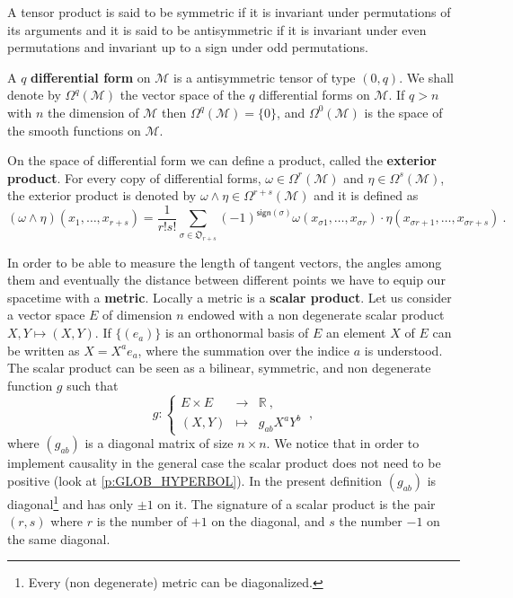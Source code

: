 \documentclass[11pt]{book}
\newcommand{\Mcal}{\mathcal{M}}
\newcommand{\Rbb}{\mathbb{R}}
\newcommand{\Orak}{\mathfrak{O}}
\theoremstyle{break}
\begin{document}
A tensor product is said to be symmetric if it is invariant under permutations of its arguments and it is said to be antisymmetric if it is invariant under even permutations and invariant up to a sign under odd permutations.


A $q$ \textbf{differential form} on $\Mcal$ is a antisymmetric tensor of type $(0,q)$. We shall denote by $\Omega^q(\Mcal)$ the vector space of the $q$ differential forms on $\Mcal$. If $q > n$ with $n$ the dimension of $\Mcal$ then $\Omega^q(\Mcal)=\{0\}$, and $\Omega^0(\Mcal)$ is the space of the smooth functions on $\Mcal$.


On the space of differential form we can define a product, called the \textbf{exterior product}. For every copy of differential forms, $\omega \in \Omega^r(\Mcal)$ and $\eta \in \Omega^s(\Mcal)$, the exterior product is denoted by 
$\omega \wedge \eta \in \Omega^{r+s}(\Mcal)$ and it is defined  as
%
\begin{equation*}
(\omega \wedge \eta)(x_1,\dots,x_{r+s}) = \frac{1}{r!s!} \sum_{\sigma \in \Orak_{r+s}} (-1)^{\mathsf{sign}(\sigma)} \omega(x_{\sigma{1}},\dots,x_{\sigma{r}}) \cdot \eta(x_{\sigma{r+1}},\dots,x_{\sigma{r+s}}) \ .
\end{equation*}


\bigskip


In order to be able to measure the length of tangent vectors, the angles among them and eventually the distance between different points we have to equip our spacetime with a \textbf{metric}. Locally a metric is a \textbf{scalar product}. Let us consider a vector space $E$ of dimension $n$ endowed with a non degenerate scalar product $X,Y \mapsto (X,Y)$. If $\{(e_a)\}$ is an orthonormal basis of $E$ an element $X$ of $E$ can be written as $X = X^a e_a$, where the summation over the indice $a$ is understood. The scalar product can be seen as a bilinear, symmetric, and non degenerate function $g$ such that
%
\begin{equation*}
g : \left\{ 
\begin{array}{lcl}
E \times E & \to & \Rbb \ , \\
(X,Y) & \mapsto & g_{ab} X^a Y^b
\end{array}
\right. \ ,
\end{equation*}
%
where $(g_{ab})$ is a diagonal matrix of size $n \times n$. We notice that in order to implement causality in the general case the scalar product does not need to be positive (look at \ref{p:GLOB_HYPERBOL}). In the present definition $(g_{ab})$ is diagonal\footnote{Every (non degenerate) metric can be diagonalized.} and has only $\pm 1$ on it. The signature of a scalar product is the pair $(r,s)$ where $r$ is the number of $+1$ on the diagonal, and $s$ the number $-1$ on the same diagonal. 
\end{document}
